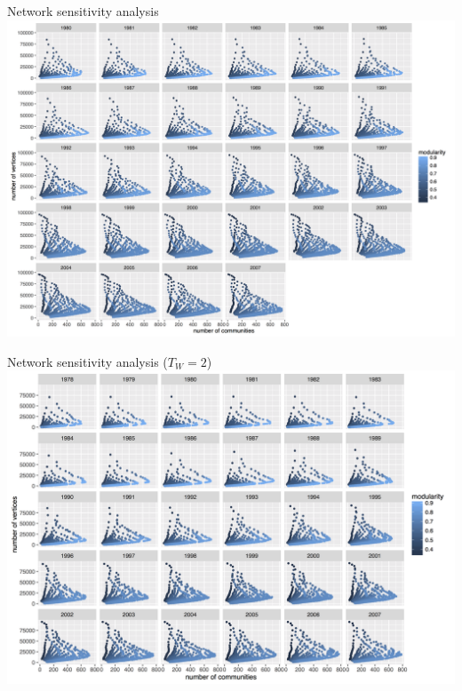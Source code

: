 \documentclass{beamer}
\begin{document}
\begin{frame}{Network sensitivity analysis}
	\includegraphics[width=\textwidth]{figures/vcount_comnum_pareto.png}
\end{frame}


\begin{frame}{Network sensitivity analysis ($T_W = 2$)}
	\includegraphics[width=\textwidth]{figures/vcount_comnum_pareto_window3.png}
\end{frame}
\end{document}
